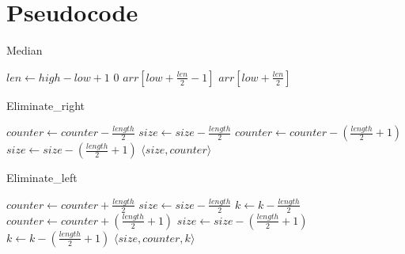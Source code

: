 \documentclass{article}
\begin{document}
\section{Pseudocode}

\begin{algorithm}
\caption{Median}
\begin{algorithmic}[1]
        \State $len \gets high - low + 1$
            \State \Return $0$
        \EndIf
            \State \Return $arr[low + \frac{len}{2} - 1]$
        \Else
            \State \Return $arr[low + \frac{len}{2}]$
        \EndIf
    \EndFunction
\end{algorithmic}
\end{algorithm}

\begin{algorithm}
\caption{Eliminate\_right}
\begin{algorithmic}[1]
                \State $counter \gets counter - \frac{length}{2}$
                \State $size \gets size - \frac{length}{2}$
            \Else
                \State $counter \gets counter - (\frac{length}{2} + 1)$
                \State $size \gets size - (\frac{length}{2} + 1)$
            \EndIf
        \EndIf
        \State \Return $\langle size, counter \rangle$
    \EndFunction
\end{algorithmic}
\end{algorithm}

\begin{algorithm}
\caption{Eliminate\_left}
\begin{algorithmic}[1]
                \State $counter \gets counter + \frac{length}{2}$
                \State $size \gets size - \frac{length}{2}$
                \State $k \gets k - \frac{length}{2}$
            \Else
                \State $counter \gets counter + (\frac{length}{2} + 1)$
                \State $size \gets size - (\frac{length}{2} + 1)$
                \State $k \gets k - (\frac{length}{2} + 1)$
            \EndIf
        \EndIf
        \State \Return $\langle size, counter, k \rangle$
    \EndFunction
\end{algorithmic}
\end{algorithm}
\end{document}
